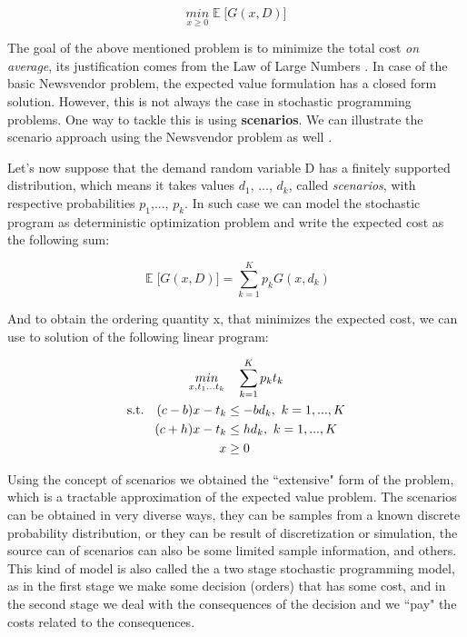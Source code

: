 \documentclass[11pt,a4paper]{article}
\DeclareMathOperator{\EX}{\mathbb{E}}
\begin{document}
\begin{equation}
\underset{x\geq 0}{min} \EX\lbrack{G(x,D)} \rbrack
\end{equation}

The goal of the above mentioned problem is to minimize the total cost \textit{on average}, its justification comes from the Law of Large Numbers \cite{sp_tut}. In case of the basic Newsvendor problem, the expected value formulation has a closed form solution. However, this is not always the case in stochastic programming problems. One way to tackle this is using \textbf{scenarios}. We can illustrate the scenario approach using the Newsvendor problem as well \cite{sp_book}. 

Let's now suppose that the demand random variable D has a finitely supported distribution, which means it takes values $d_{1}$, ..., $d_{k}$, called \textit{scenarios}, with respective probabilities $p_{1}$,..., $p_{k}$. In such case we can model the stochastic program as deterministic optimization problem and write the expected cost as the following sum:

\begin{equation}
 \EX \lbrack G(x,D) \rbrack = \sum\limits_{k=1}^{K}{p_k G(x, d_k)}
\end{equation}

And to obtain the ordering quantity x, that minimizes the expected cost, we can use to solution of the following linear program:

\begin{equation}
\begin{gathered}
\underset{x,t_1...t_k}{min}\quad 
\sum\limits_{k=1}^{K}{p_k t_k} \\
\begin{aligned}
 \textup{s.t.}\quad (c-b)x -t_k & \leq  -b d_k,\ k = 1,...,K  \\
 (c+h)x -t_k & \leq h d_k,\ k = 1,...,K  \\
x & \geq 0
\end{aligned}
\end{gathered}
\end{equation}

Using the concept of scenarios we obtained the ``extensive" form of the problem, which is a tractable approximation of the expected value problem. The scenarios can be obtained in very diverse ways, they can be samples from a known discrete probability distribution, or they can be result of discretization or simulation, the source can of scenarios can also be some limited sample information, and others. This kind of model is also called the a two stage stochastic programming model, as in the first stage we make some decision (orders) that has some cost, and in the second stage we deal with the consequences of the decision and we ``pay" the costs related to the consequences.
\end{document}
